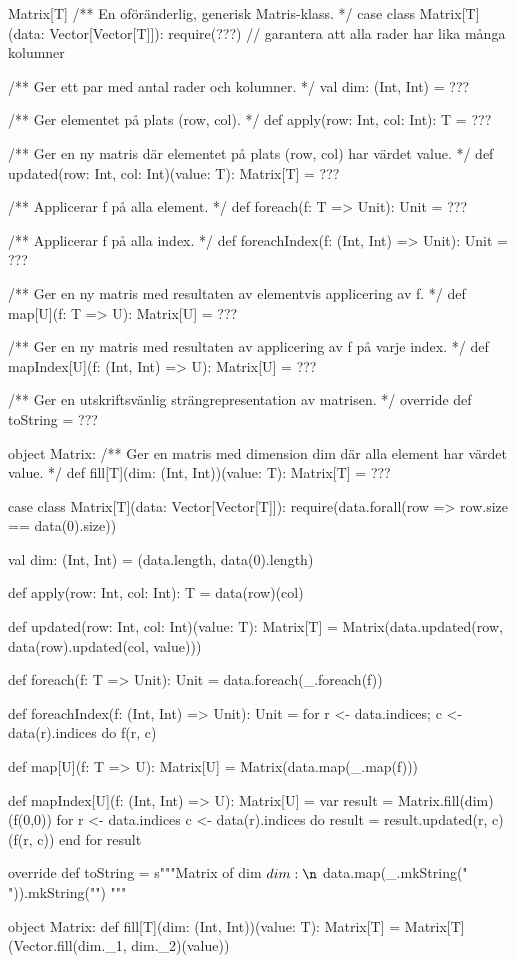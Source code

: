 \begin{ScalaSpec}{Matrix[T]}
/** En oföränderlig, generisk Matris-klass. */
case class Matrix[T](data: Vector[Vector[T]]):
  require(???)  // garantera att alla rader har lika många kolumner

  /** Ger ett par med antal rader och kolumner. */
  val dim: (Int, Int) = ???

  /** Ger elementet på plats (row, col). */
  def apply(row: Int, col: Int): T = ???

  /** Ger en ny matris där elementet på plats (row, col) har värdet value. */
  def updated(row: Int, col: Int)(value: T): Matrix[T] =  ???

  /** Applicerar f på alla element. */
  def foreach(f: T => Unit): Unit = ???

  /** Applicerar f på alla index. */
  def foreachIndex(f: (Int, Int) => Unit): Unit = ???

  /** Ger en ny matris med resultaten av elementvis applicering av f. */
  def map[U](f: T => U): Matrix[U] = ???

  /** Ger en ny matris med resultaten av applicering av f på varje index. */
  def mapIndex[U](f: (Int, Int) => U): Matrix[U] = ???

  /** Ger en utskriftsvänlig strängrepresentation av matrisen. */
  override def toString = ???

object Matrix:
  /** Ger en matris med dimension dim där alla element har värdet value. */
  def fill[T](dim: (Int, Int))(value: T): Matrix[T] = ???
\end{ScalaSpec}

\SOLUTION


\TaskSolved \what

\begin{CodeSmall}
case class Matrix[T](data: Vector[Vector[T]]):
  require(data.forall(row => row.size == data(0).size))

  val dim: (Int, Int) = (data.length, data(0).length)

  def apply(row: Int, col: Int): T = data(row)(col)

  def updated(row: Int, col: Int)(value: T): Matrix[T] =
    Matrix(data.updated(row, data(row).updated(col, value)))

  def foreach(f: T => Unit): Unit = data.foreach(_.foreach(f))

  def foreachIndex(f: (Int, Int) => Unit): Unit =
    for r <- data.indices; c <- data(r).indices do f(r, c)

  def map[U](f: T => U): Matrix[U] = Matrix(data.map(_.map(f)))

  def mapIndex[U](f: (Int, Int) => U): Matrix[U] =
    var result = Matrix.fill(dim)(f(0,0))
    for 
      r <- data.indices
      c <- data(r).indices 
    do
      result = result.updated(r, c)(f(r, c))
    end for
    result

  override def toString =
    s"""Matrix of dim $dim:\n${ data.map(_.mkString(" ")).mkString("\n") }"""

object Matrix:
  def fill[T](dim: (Int, Int))(value: T): Matrix[T] =
    Matrix[T](Vector.fill(dim._1, dim._2)(value))
\end{CodeSmall}


